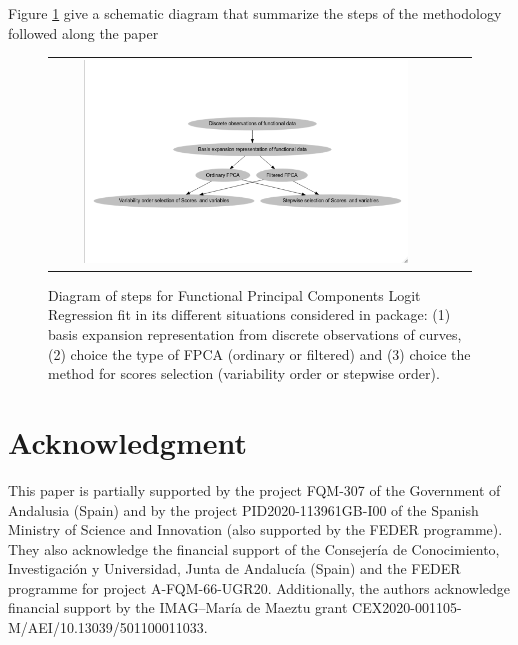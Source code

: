 Figure \ref{Diag} give a schematic diagram that summarize the steps of the  methodology followed along the paper

\begin{figure}
\begin{center}
\begin{tabular}{ccc}
\includegraphics[width=0.85\textwidth]{Graphs/Diagram.png}
\end{tabular}
\end{center}
\caption{Diagram of steps for Functional Principal Components Logit Regression fit in its different situations considered in  package: (1) basis expansion representation from discrete observations of curves, (2) choice the type of FPCA (ordinary or filtered) and (3) choice the method for scores selection (variability order or stepwise order).}
\label{Diag}
\end{figure}


\section{Acknowledgment}

This paper is partially supported by the project FQM-307 of the Government of Andalusia (Spain) and  by the project PID2020-113961GB-I00 of the Spanish Ministry of Science and Innovation (also supported by the FEDER programme). They also acknowledge the financial support of the Consejería de Conocimiento, Investigación y Universidad, Junta de Andalucía (Spain) and the FEDER programme for project A-FQM-66-UGR20. Additionally, the authors acknowledge financial support by the IMAG–María de Maeztu grant CEX2020-001105-M/AEI/10.13039/501100011033.



\address{Manuel Escabias\\
  Department of Statistics and Operation Research, University of Granada\\
  Facultad de Farmacia, Campus de Cartuja. 18071 Granada\\
  Spain\\
  ORCiD: 0000-0002-1653-9022\\
  }

